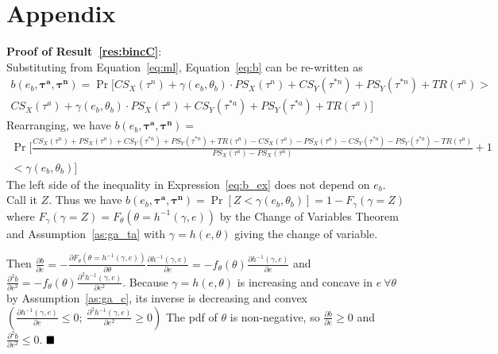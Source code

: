 \documentclass[10pt]{article}
\newcommand{\ve}{\theta}
\newcommand{\ta}{\theta}
\newcommand{\bta}{\bm{\tau^a}}
\newcommand{\btn}{\bm{\tau^n}}
\newcommand{\ga}{\gamma}
\begin{document}
\section{Appendix}
\label{sec:appendix}
\noindent \textbf{\hypertarget{Pr_bincC}{Proof of Result~\ref{res:bincC}}}:\\
Substituting from Equation~\ref{eq:ml}, Equation~\ref{eq:b} can be re-written as
\begin{multline}  
  b(e_b,\bta,\btn) = \Pr [ \mathit{CS}_X(\tau^n) + \ga(e_b,\ve_b) \cdot \mathit{PS}_X(\tau^n) + \mathit{CS}_Y(\tau^{*n}) + \mathit{PS}_Y(\tau^{*n}) + \mathit{TR}(\tau^n) >  \\ \mathit{CS}_X(\tau^a) + \ga(e_b,\ve_b) \cdot \mathit{PS}_X(\tau^a) + \mathit{CS}_Y(\tau^{*a}) + \mathit{PS}_Y(\tau^{*a}) + \mathit{TR}(\tau^a) ]
\end{multline}
Rearranging, we have $b(e_b,\bta,\btn) = $
\begin{multline}  
  \textstyle \Pr \Big[ \frac{\mathit{CS}_X(\tau^n) + \mathit{PS}_X(\tau^n) + \mathit{CS}_Y(\tau^{*n}) + \mathit{PS}_Y(\tau^{*n}) + \mathit{TR}(\tau^n)  -\mathit{CS}_X(\tau^a) - \mathit{PS}_X(\tau^a) - \mathit{CS}_Y(\tau^{*a}) - \mathit{PS}_Y(\tau^{*a}) - \mathit{TR}(\tau^a)}{\mathit{PS}_X(\tau^a) - \mathit{PS}_X(\tau^n)} + 1 \\ \textstyle < \ga(e_b,\ve_b) \Big]
  \label{eq:b_ex}
\end{multline}
\noindent The left side of the inequality in Expression~\ref{eq:b_ex} does not depend on $e_b$. Call it $Z$. Thus we have $b(e_b,\bta,\btn) = \Pr [Z < \ga(e_b,\ve_b) ] = 1 - F_{\ga}(\ga=Z)$ where $F_{\ga}(\ga=Z) = F_{\ta}(\ta=h^{-1}(\ga,e))$ by the Change of Variables Theorem and Assumption~\ref{as:ga_ta} with $\ga = h(e,\ta)$ giving the change of variable.

Then $\frac{\partial b}{\partial e} = -\frac{\partial F_{\ta}(\ta=h^{-1}(\ga,e))}{\partial \ta}\frac{\partial h^{-1}(\ga,e)}{\partial e} = -f_\ta(\ta) \frac{\partial h^{-1}(\ga,e)}{\partial e}$ and $\frac{\partial^2 b}{\partial e^2} = -f_\ta(\ta) \frac{\partial^2 h^{-1}(\ga,e)}{\partial e^2}$. Because $\ga = h(e,\ta)$ is increasing and concave in $e \ \forall \ta$ by Assumption~\ref{as:ga_c}, its inverse is decreasing and convex $\left(\frac{\partial h^{-1}(\ga,e)}{\partial e}\leq 0; \ \frac{\partial^2 h^{-1}(\ga,e)}{\partial e^2} \geq 0 \right)$ The pdf of $\ta$ is non-negative, so $\frac{\partial b}{\partial e} \geq 0$ and $\frac{\partial^2 b}{\partial e^2} \leq 0$. $\hfill\blacksquare$
\end{document}
